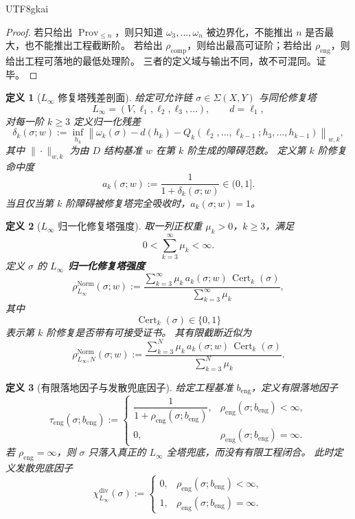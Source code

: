 \documentclass[12pt]{article}
\newtheorem{definition}{定义}[section]
\newcommand{\Linfty}{\ensuremath{L_\infty}}
\newcommand{\Cert}{\operatorname{Cert}}
\newcommand{\Prov}{\operatorname{Prov}}
\newcommand{\Norm}{\operatorname{Norm}}
\begin{document}
\begin{CJK*}{UTF8}{gkai}
\begin{proof}
若只给出 $\Prov_{\le n}$，则只知道 $\omega_3,\dots,\omega_n$ 被边界化，不能推出 $n$ 是否最大，也不能推出工程截断阶。
若给出 $\rho_{\mathrm{comp}}$，则给出最高可证阶；若给出 $\rho_{\mathrm{eng}}$，则给出工程可落地的最低处理阶。
三者的定义域与输出不同，故不可混同。证毕。
\end{proof}

\begin{definition}[\texorpdfstring{$L_\infty$}{L-infinity} 修复塔残差剖面]
\label{def:tex50-linfty-residual-profile}
给定可允许链 $\sigma\in\Sigma(X,Y)$ 与同伦修复塔
\[
  \Linfty=(V,\ell_1,\ell_2,\ell_3,\dots),
  \qquad d=\ell_1,
\]
对每一阶 $k\ge3$ 定义归一化残差
\[
  \delta_k(\sigma;w)
  :=
  \inf_{h_k}
  \left\|
    \omega_k(\sigma)
    -
    d(h_k)
    -
    Q_k(\ell_2,\dots,\ell_{k-1};h_3,\dots,h_{k-1})
  \right\|_{w,k},
\]
其中 $\|\cdot\|_{w,k}$ 为由 $D$ 结构基准 $w$ 在第 $k$ 阶生成的障碍范数。
定义第 $k$ 阶修复命中度
\[
  a_k(\sigma;w)
  :=
  \frac{1}{1+\delta_k(\sigma;w)}
  \in(0,1].
\]
当且仅当第 $k$ 阶障碍被修复塔完全吸收时，$a_k(\sigma;w)=1$。
\end{definition}

\begin{definition}[\texorpdfstring{$L_\infty$}{L-infinity} 归一化修复塔强度]
\label{def:tex50-linfty-normalized-strength}
取一列正权重 $\mu_k>0$，$k\ge3$，满足
\[
  0<\sum_{k=3}^{\infty}\mu_k<\infty.
\]
定义 $\sigma$ 的 \textbf{\(\Linfty\) 归一化修复塔强度}
\[
  \rho_{\Linfty}^{\Norm}(\sigma;w)
  :=
  \frac{
    \sum_{k=3}^{\infty}\mu_k\,a_k(\sigma;w)\,\Cert_k(\sigma)
  }{
    \sum_{k=3}^{\infty}\mu_k
  },
\]
其中
\[
  \Cert_k(\sigma)\in\{0,1\}
\]
表示第 $k$ 阶修复是否带有可接受证书。
其有限截断近似为
\[
  \rho_{\Linfty,N}^{\Norm}(\sigma;w)
  :=
  \frac{
    \sum_{k=3}^{N}\mu_k\,a_k(\sigma;w)\,\Cert_k(\sigma)
  }{
    \sum_{k=3}^{N}\mu_k
  }.
\]
\end{definition}

\begin{definition}[有限落地因子与发散兜底因子]
\label{def:tex50-finite-landing-factor}
给定工程基准 $b_{\mathrm{eng}}$，定义有限落地因子
\[
  \tau_{\mathrm{eng}}(\sigma;b_{\mathrm{eng}})
  :=
  \begin{cases}
    \dfrac{1}{1+\rho_{\mathrm{eng}}(\sigma;b_{\mathrm{eng}})},
    & \rho_{\mathrm{eng}}(\sigma;b_{\mathrm{eng}})<\infty,\\[6pt]
    0,
    & \rho_{\mathrm{eng}}(\sigma;b_{\mathrm{eng}})=\infty.
  \end{cases}
\]
若 $\rho_{\mathrm{eng}}=\infty$，则 $\sigma$ 只落入真正的 $\Linfty$ 全塔兜底，而没有有限工程闭合。
此时定义发散兜底因子
\[
  \chi_{\Linfty}^{\mathrm{div}}(\sigma)
  :=
  \begin{cases}
    0,& \rho_{\mathrm{eng}}(\sigma;b_{\mathrm{eng}})<\infty,\\
    1,& \rho_{\mathrm{eng}}(\sigma;b_{\mathrm{eng}})=\infty.
  \end{cases}
\]
\end{definition}


\end{CJK*}
\end{document}
